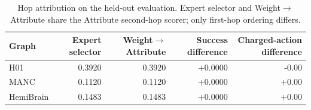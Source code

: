 \begin{table}[h]
\centering\scriptsize
\setlength{\tabcolsep}{3pt}
\caption{Hop attribution on the held-out evaluation. Expert selector and Weight$\to$Attribute share the Attribute second-hop scorer; only first-hop ordering differs.}
\label{tab:hop-attribution}
\begin{tabular}{lrrrr}
\toprule
Graph & Expert selector & Weight$\to$Attribute & Success difference & Charged-action difference \\
\midrule
H01 & 0.3920 & 0.3920 & +0.0000 & -0.00 \\
MANC & 0.1120 & 0.1120 & +0.0000 & +0.00 \\
HemiBrain & 0.1483 & 0.1483 & +0.0000 & +0.00 \\
\bottomrule
\end{tabular}
\end{table}
